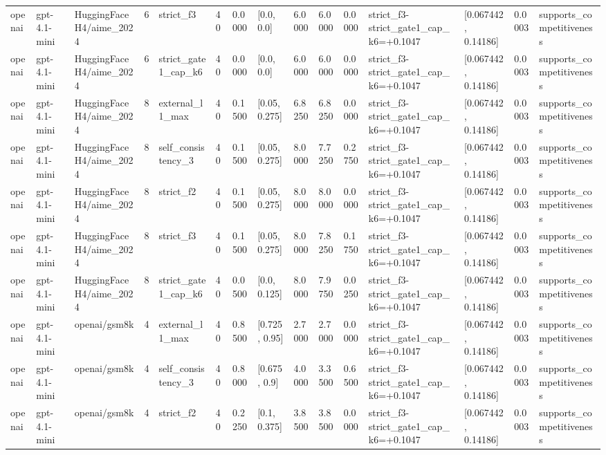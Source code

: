 \begin{tabular}{lllllllllllllll}
openai & gpt-4.1-mini & HuggingFaceH4/aime\_2024 & 6 & strict\_f3 & 40 & 0.0000 & [0.0, 0.0] & 6.0000 & 6.0000 & 0.0000 & strict\_f3-strict\_gate1\_cap\_k6=+0.1047 & [0.067442, 0.14186] & 0.0003 & supports\_competitiveness \\
openai & gpt-4.1-mini & HuggingFaceH4/aime\_2024 & 6 & strict\_gate1\_cap\_k6 & 40 & 0.0000 & [0.0, 0.0] & 6.0000 & 6.0000 & 0.0000 & strict\_f3-strict\_gate1\_cap\_k6=+0.1047 & [0.067442, 0.14186] & 0.0003 & supports\_competitiveness \\
openai & gpt-4.1-mini & HuggingFaceH4/aime\_2024 & 8 & external\_l1\_max & 40 & 0.1500 & [0.05, 0.275] & 6.8250 & 6.8250 & 0.0000 & strict\_f3-strict\_gate1\_cap\_k6=+0.1047 & [0.067442, 0.14186] & 0.0003 & supports\_competitiveness \\
openai & gpt-4.1-mini & HuggingFaceH4/aime\_2024 & 8 & self\_consistency\_3 & 40 & 0.1500 & [0.05, 0.275] & 8.0000 & 7.7250 & 0.2750 & strict\_f3-strict\_gate1\_cap\_k6=+0.1047 & [0.067442, 0.14186] & 0.0003 & supports\_competitiveness \\
openai & gpt-4.1-mini & HuggingFaceH4/aime\_2024 & 8 & strict\_f2 & 40 & 0.1500 & [0.05, 0.275] & 8.0000 & 8.0000 & 0.0000 & strict\_f3-strict\_gate1\_cap\_k6=+0.1047 & [0.067442, 0.14186] & 0.0003 & supports\_competitiveness \\
openai & gpt-4.1-mini & HuggingFaceH4/aime\_2024 & 8 & strict\_f3 & 40 & 0.1500 & [0.05, 0.275] & 8.0000 & 7.8250 & 0.1750 & strict\_f3-strict\_gate1\_cap\_k6=+0.1047 & [0.067442, 0.14186] & 0.0003 & supports\_competitiveness \\
openai & gpt-4.1-mini & HuggingFaceH4/aime\_2024 & 8 & strict\_gate1\_cap\_k6 & 40 & 0.0500 & [0.0, 0.125] & 8.0000 & 7.9750 & 0.0250 & strict\_f3-strict\_gate1\_cap\_k6=+0.1047 & [0.067442, 0.14186] & 0.0003 & supports\_competitiveness \\
openai & gpt-4.1-mini & openai/gsm8k & 4 & external\_l1\_max & 40 & 0.8500 & [0.725, 0.95] & 2.7000 & 2.7000 & 0.0000 & strict\_f3-strict\_gate1\_cap\_k6=+0.1047 & [0.067442, 0.14186] & 0.0003 & supports\_competitiveness \\
openai & gpt-4.1-mini & openai/gsm8k & 4 & self\_consistency\_3 & 40 & 0.8000 & [0.675, 0.9] & 4.0000 & 3.3500 & 0.6500 & strict\_f3-strict\_gate1\_cap\_k6=+0.1047 & [0.067442, 0.14186] & 0.0003 & supports\_competitiveness \\
openai & gpt-4.1-mini & openai/gsm8k & 4 & strict\_f2 & 40 & 0.2250 & [0.1, 0.375] & 3.8500 & 3.8500 & 0.0000 & strict\_f3-strict\_gate1\_cap\_k6=+0.1047 & [0.067442, 0.14186] & 0.0003 & supports\_competitiveness \\

\end{tabular}
